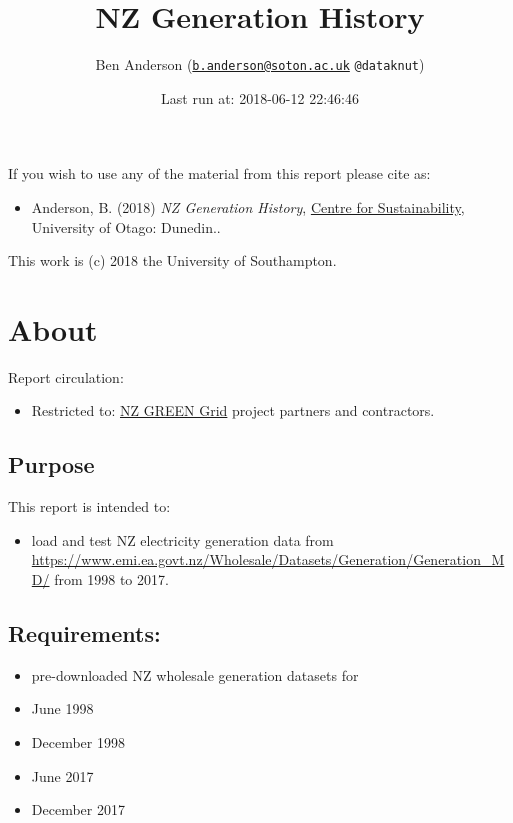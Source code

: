 \documentclass[]{article}
\title{NZ Generation History}
\author{Ben Anderson
(\href{mailto:b.anderson@soton.ac.uk}{\nolinkurl{b.anderson@soton.ac.uk}}
\texttt{@dataknut})}
\date{Last run at: 2018-06-12 22:46:46}
\providecommand{\tightlist}{%
  \setlength{\itemsep}{0pt}\setlength{\parskip}{0pt}}
\begin{document}
\maketitle

{
\setcounter{tocdepth}{2}
\tableofcontents
}
If you wish to use any of the material from this report please cite as:

\begin{itemize}
\tightlist
\item
  Anderson, B. (2018) \emph{NZ Generation History},
  \href{http://www.otago.ac.nz/centre-sustainability/}{Centre for
  Sustainability}, University of Otago: Dunedin..
\end{itemize}

This work is (c) 2018 the University of Southampton.

\newpage

\section{About}\label{about}

Report circulation:

\begin{itemize}
\tightlist
\item
  Restricted to:
  \href{https://www.otago.ac.nz/centre-sustainability/research/energy/otago050285.html}{NZ
  GREEN Grid} project partners and contractors.
\end{itemize}

\subsection{Purpose}\label{purpose}

This report is intended to:

\begin{itemize}
\tightlist
\item
  load and test NZ electricity generation data from
  \url{https://www.emi.ea.govt.nz/Wholesale/Datasets/Generation/Generation_MD/}
  from 1998 to 2017.
\end{itemize}

\subsection{Requirements:}\label{requirements}

\begin{itemize}
\tightlist
\item
  pre-downloaded NZ wholesale generation datasets for
\item
  June 1998
\item
  December 1998
\item
  June 2017
\item
  December 2017
\end{itemize}
\end{document}
